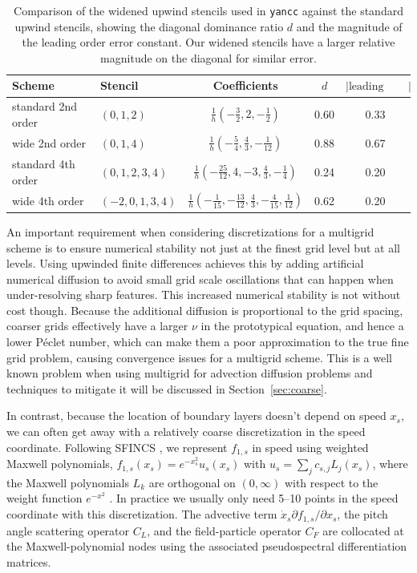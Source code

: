 \documentclass[11pt]{article}
\newcommand{\yancc}{\texttt{yancc}}
\begin{document}
\begin{table}[htbp]
\centering
\begin{tabular}{llccc}
\toprule
Scheme & Stencil & Coefficients & $d$ & $|\text{leading error}|$ \\
\midrule
standard 2nd order & $(0,1,2)$ &
  $\frac{1}{h}(-\frac{3}{2}, 2, -\frac{1}{2})$ & 0.60 & 0.33 \\
wide 2nd order & $(0,1,4)$ &
  $\frac{1}{h}(-\frac{5}{4}, \frac{4}{3}, -\frac{1}{12})$ & 0.88 & 0.67 \\
standard 4th order & $(0,1,2,3,4)$ &
  $\frac{1}{h}(-\frac{25}{12}, 4, -3, \frac{4}{3}, -\frac{1}{4})$ & 0.24 & 0.20
  \\
wide 4th order & $(-2, 0, 1, 3, 4)$ &
  $\frac{1}{h}(-\frac{1}{15}, -\frac{13}{12}, \frac{4}{3}, -\frac{4}{15},
  \frac{1}{12})$ & 0.62 & 0.20 \\
\bottomrule
\end{tabular}
\caption{Comparison of the widened upwind stencils used in \yancc{} against the
standard upwind stencils, showing the diagonal dominance ratio $d$ and the
magnitude of the leading order error constant. Our widened stencils have a larger
relative magnitude on the diagonal for similar error.}
\label{tab:stencil}
\end{table}

An important requirement when considering discretizations for a multigrid
scheme is to ensure numerical stability not just at the finest grid level but at
all levels. Using upwinded finite differences achieves this by adding artificial
numerical diffusion to avoid small grid scale oscillations that can happen when
under-resolving sharp features. This increased numerical stability is not
without cost though. Because the additional diffusion is proportional to the
grid spacing, coarser grids effectively have a larger $\nu$ in the prototypical
equation, and hence a lower P\'eclet number, which can make
them a poor approximation to the true fine grid problem, causing convergence
issues for a multigrid scheme. This is a well known problem when using multigrid
for advection diffusion problems \cite{trottenberg_multigrid_2007} and
techniques to mitigate it will be
discussed in Section~\ref{sec:coarse}.

In contrast, because the location of boundary layers doesn't depend on speed
$x_s$, we can often get away with a relatively coarse discretization in the speed coordinate.
Following SFINCS \cite{landreman_comparison_2014}, we represent $f_{1,s}$ in
speed using weighted Maxwell polynomials,
$f_{1,s}(x_s) = e^{-x_s^2} u_s(x_s)$ with $u_s = \sum_j c_{s,j} L_j(x_s)$, where
the Maxwell polynomials $L_k$ are orthogonal on $(0, \infty)$ with respect
to the weight
function $e^{-x^2}$ \cite{landreman_new_2013}. In practice we usually only need
5--10 points in the speed
coordinate with this discretization. The advective term
$\dot{x}_s \partial f_{1,s}/\partial x_s$, the pitch angle scattering operator
$C_L$, and the field-particle operator $C_F$ are collocated at the
Maxwell-polynomial nodes using the associated pseudospectral differentiation
matrices.
\end{document}
